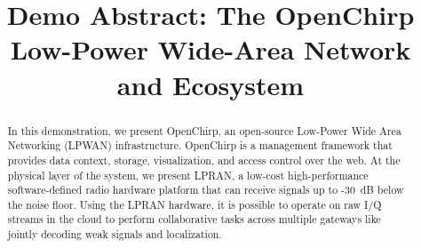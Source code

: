 \documentclass[conference]{IEEEtran}
\begin{document}
\title{Demo Abstract: The OpenChirp Low-Power Wide-Area Network and Ecosystem}
\author{
}


% 








\maketitle

\begin{abstract}

In this demonstration, we present OpenChirp, an open-source Low-Power Wide Area Networking (LPWAN) infrastructure. OpenChirp is a management framework that provides data context, storage, visualization, and access control over the web.  At the physical layer of the system,  we  present LPRAN, a low-cost high-performance software-defined radio hardware platform that can receive signals up to -30~dB below the noise floor. Using the LPRAN hardware, it is possible to operate on raw I/Q streams in the cloud to perform collaborative tasks across multiple gateways like jointly decoding weak signals and localization. 

\end{abstract}
\end{document}
